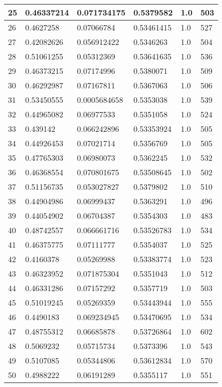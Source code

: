 \begin{longtable}{|l|l|l|l|l|l|}
25 & 0.46337214 & 0.071734175 & 0.5379582 & 1.0 & 503 \\ \hline 
26 & 0.4627258 & 0.07066784 & 0.53461415 & 1.0 & 527 \\ \hline 
27 & 0.42082626 & 0.056912422 & 0.5346263 & 1.0 & 504 \\ \hline 
28 & 0.51061255 & 0.05312369 & 0.53641635 & 1.0 & 536 \\ \hline 
29 & 0.46373215 & 0.07174996 & 0.5380071 & 1.0 & 509 \\ \hline 
30 & 0.46292987 & 0.07167811 & 0.5367063 & 1.0 & 506 \\ \hline 
31 & 0.53450555 & 0.0005684658 & 0.5353038 & 1.0 & 539 \\ \hline 
32 & 0.44965082 & 0.06977533 & 0.5351058 & 1.0 & 524 \\ \hline 
33 & 0.439142 & 0.066242896 & 0.53353924 & 1.0 & 505 \\ \hline 
34 & 0.44926453 & 0.07021714 & 0.5356769 & 1.0 & 505 \\ \hline 
35 & 0.47765303 & 0.06980073 & 0.5362245 & 1.0 & 532 \\ \hline 
36 & 0.46368554 & 0.070801675 & 0.53508645 & 1.0 & 502 \\ \hline 
37 & 0.51156735 & 0.053027827 & 0.5379802 & 1.0 & 510 \\ \hline 
38 & 0.44904986 & 0.06999437 & 0.5363291 & 1.0 & 496 \\ \hline 
39 & 0.44054902 & 0.06704387 & 0.5354303 & 1.0 & 483 \\ \hline 
40 & 0.48742557 & 0.066661716 & 0.53526783 & 1.0 & 534 \\ \hline 
41 & 0.46375775 & 0.07111777 & 0.5354037 & 1.0 & 525 \\ \hline 
42 & 0.4160378 & 0.05269988 & 0.53383774 & 1.0 & 523 \\ \hline 
43 & 0.46323952 & 0.071875304 & 0.5351043 & 1.0 & 512 \\ \hline 
44 & 0.46331286 & 0.07157292 & 0.5357719 & 1.0 & 503 \\ \hline 
45 & 0.51019245 & 0.05269359 & 0.53443944 & 1.0 & 555 \\ \hline 
46 & 0.4490183 & 0.069234945 & 0.53470695 & 1.0 & 534 \\ \hline 
47 & 0.48755312 & 0.06685878 & 0.53726864 & 1.0 & 602 \\ \hline 
48 & 0.5069232 & 0.05715734 & 0.5373396 & 1.0 & 543 \\ \hline 
49 & 0.5107085 & 0.05344806 & 0.53612834 & 1.0 & 570 \\ \hline 
50 & 0.4988222 & 0.06191289 & 0.5355117 & 1.0 & 551 \\ \hline 
\end{longtable}